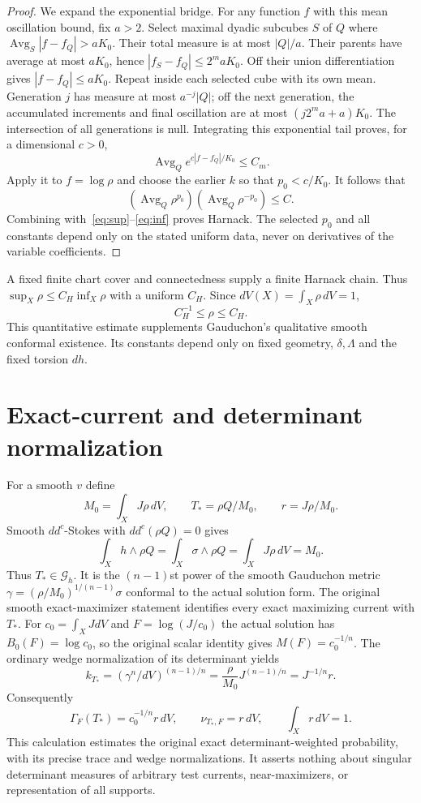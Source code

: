 \documentclass[11pt]{article}
\theoremstyle{remark}\newtheorem{remark}[theorem]{Remark}
\newcommand{\ddc}{dd^c}
\newcommand{\avg}{\mathop{\mathrm{Avg}}}
\begin{document}
\begin{proof}
We expand the exponential bridge. For any function $f$ with this
mean oscillation bound, fix $a>2$. Select maximal dyadic subcubes
$S$ of $Q$ where $\avg_S|f-f_Q|>aK_0$.
Their total measure is at most $|Q|/a$.
Their parents have average at most $aK_0$, hence
$|f_S-f_Q|\leq2^maK_0$.
Off their union differentiation gives $|f-f_Q|\leq aK_0$.
Repeat inside each selected cube with its own mean. Generation
$j$ has measure at most $a^{-j}|Q|$; off the next generation,
the accumulated increments and final oscillation are at most
$(j2^ma+a)K_0$. The intersection of all generations is null.
Integrating this exponential tail proves, for a dimensional $c>0$,
\[
 \avg_Q e^{c|f-f_Q|/K_0}\leq C_m.
\]
Apply it to $f=\log\rho$ and choose the earlier $k$ so that
$p_0<c/K_0$. It follows that
\[
 (\avg_Q\rho^{p_0})(\avg_Q\rho^{-p_0})\leq C.
\]
Combining with~\eqref{eq:sup}--\eqref{eq:inf} proves Harnack.
The selected $p_0$ and all constants depend only on the stated
uniform data, never on derivatives of the variable coefficients.
\end{proof}

A fixed finite chart cover and connectedness supply a finite
Harnack chain. Thus $\sup_X\rho\leq C_H\inf_X\rho$ with a
uniform $C_H$. Since $dV(X)=\int_X\rho\,dV=1$,
\begin{equation}\label{eq:rho}
 C_H^{-1}\leq\rho\leq C_H.
\end{equation}
This quantitative estimate supplements Gauduchon's qualitative
smooth conformal existence. Its constants depend only on fixed
geometry, $\delta,\Lambda$ and the fixed torsion $dh$.

\section{Exact-current and determinant normalization}
For a smooth $v$ define
\[
 M_0=\int_XJ\rho\,dV,\qquad
 T_* =\rho Q/M_0,\qquad r=J\rho/M_0.
\]
Smooth $\ddc$-Stokes with $\ddc(\rho Q)=0$ gives
\[
 \int_Xh\wedge\rho Q
  =\int_X\sigma\wedge\rho Q
  =\int_XJ\rho\,dV=M_0.
\]
Thus $T_*\in\mathcal G_h$. It is the $(n-1)$st power of the
smooth Gauduchon metric
$\gamma=(\rho/M_0)^{1/(n-1)}\sigma$ conformal to the actual
solution form. The original smooth exact-maximizer statement
identifies every exact maximizing current with $T_*$.
For $c_0=\int_XJdV$ and $F=\log(J/c_0)$ the actual solution has
$B_0(F)=\log c_0$, so the original scalar identity gives
$M(F)=c_0^{-1/n}$.
The ordinary wedge normalization of its determinant yields
\[
 k_{T_*}=(\gamma^n/dV)^{(n-1)/n}
       =\frac{\rho}{M_0}J^{(n-1)/n}
       =J^{-1/n}r.
\]
Consequently
\[
 \Gamma_F(T_*)=c_0^{-1/n}r\,dV,
 \qquad \nu_{T_*,F}=r\,dV,\qquad\int_Xr\,dV=1.
\]
This calculation estimates the original exact determinant-weighted
probability, with its precise trace and wedge normalizations.
It asserts nothing about singular determinant measures of arbitrary
test currents, near-maximizers, or representation of all supports.
\end{document}
